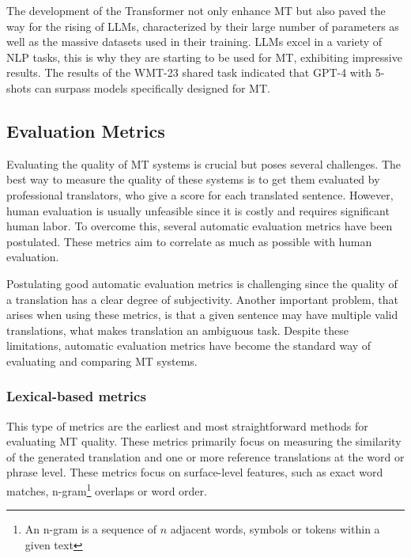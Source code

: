\documentclass[11pt,english,listoffigures,listoftables]{tfgetsinf}
\begin{document}
The development of the Transformer not only enhance MT but also paved the way for the rising of LLMs, characterized by their large number of parameters as well as the massive datasets used in their training. LLMs excel in a variety of NLP tasks, this is why they are starting to be used for MT, exhibiting impressive results. The results of the WMT-23 shared task \cite{freitag2023results} indicated that GPT-4 with 5-shots can surpass models specifically designed for MT. 


\subsection{Evaluation Metrics}

Evaluating the quality of MT systems is crucial but poses several challenges. The best way to measure the quality of these systems is to get them evaluated by professional translators, who give a score for each translated sentence. However, human evaluation is usually unfeasible since it is costly and requires significant human labor. To overcome this, several automatic evaluation metrics have been postulated. These metrics aim to correlate as much as possible with human evaluation.


Postulating good automatic evaluation metrics is challenging since the quality of a translation has a clear degree of subjectivity. Another important problem, that arises when using these metrics, is that a given sentence may have multiple valid translations, what makes translation an ambiguous task. Despite these limitations, automatic evaluation metrics have become the standard way of evaluating and comparing MT systems.

\subsubsection{Lexical-based metrics}

This type of metrics are the earliest and most straightforward methods for evaluating MT quality. These metrics primarily focus on measuring the similarity of the generated translation and one or more reference translations at the word or phrase level. These metrics focus on surface-level features, such as exact word matches, n-gram\footnote{An n-gram is a sequence of $n$ adjacent words, symbols or tokens within a given text} overlaps or word order. 
\end{document}
